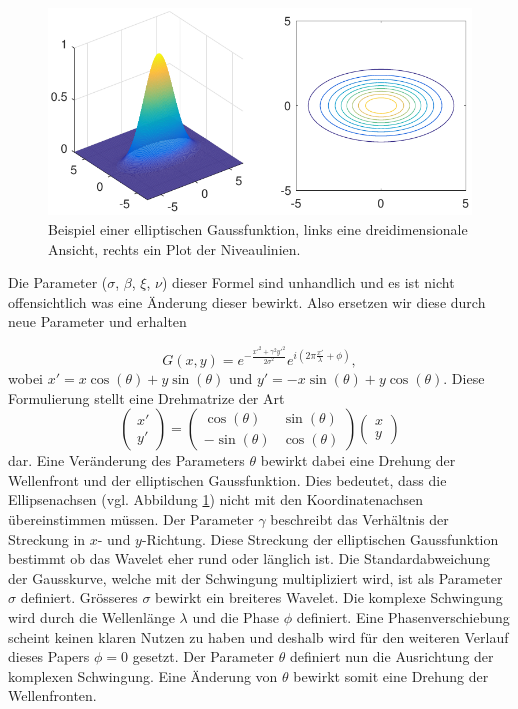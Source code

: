 \begin{figure}
	\centering
	\includegraphics[width=0.7\linewidth]{./papers/visuell/images/2d_gauss.pdf}
	\caption{Beispiel einer elliptischen Gaussfunktion, links eine dreidimensionale Ansicht, rechts ein Plot der Niveaulinien.}
	\label{fig:2d_gauss}
\end{figure}



Die Parameter ($\sigma$, $\beta$, $\xi$, $\nu$) dieser Formel sind unhandlich und es ist nicht offensichtlich was eine Änderung dieser bewirkt.
Also ersetzen wir diese durch neue Parameter und erhalten 

\begin{equation}
G(x,y)=e^{-\frac{x'^{2}+\gamma^{2}y'^{2}}{2\sigma^{2}}}
e^{i(2\pi\frac{x'}{\lambda} + \phi)},
\end{equation} 
wobei $x'=x\cos(\theta)+y\sin(\theta)$ und $y'=-x\sin(\theta)+y\cos(\theta)$.
Diese Formulierung stellt eine Drehmatrize der Art
\begin{equation}
	\begin{pmatrix}
		x' \\
		y'
	\end{pmatrix}
	=
	\begin{pmatrix}
	\cos(\theta) & \sin(\theta) \\
	-\sin(\theta) & \cos(\theta)
	\end{pmatrix}
	\begin{pmatrix}
	x \\
	y
	\end{pmatrix}
	\end{equation}
dar.
Eine Veränderung des Parameters $\theta$ bewirkt dabei eine Drehung der Wellenfront und der elliptischen Gaussfunktion.
Dies bedeutet, dass die Ellipsenachsen (vgl. Abbildung \ref{fig:2d_gauss}) nicht mit den Koordinatenachsen übereinstimmen müssen.
Der Parameter $\gamma$ beschreibt das Verhältnis der Streckung in $x$- und $y$-Richtung.
Diese Streckung der elliptischen Gaussfunktion bestimmt ob das Wavelet eher rund oder länglich ist.
Die Standardabweichung der Gausskurve, welche mit der Schwingung multipliziert wird, ist als Parameter $\sigma$ definiert.
Grösseres $\sigma$ bewirkt ein breiteres Wavelet.
Die komplexe Schwingung wird durch die Wellenlänge $\lambda$ und die Phase $\phi$ definiert.
Eine Phasenverschiebung scheint keinen klaren Nutzen zu haben und deshalb  wird für den weiteren Verlauf dieses Papers $\phi=0$ gesetzt.
Der Parameter $\theta$ definiert nun die Ausrichtung der komplexen Schwingung.
Eine Änderung von $\theta$  bewirkt somit eine Drehung der Wellenfronten.

